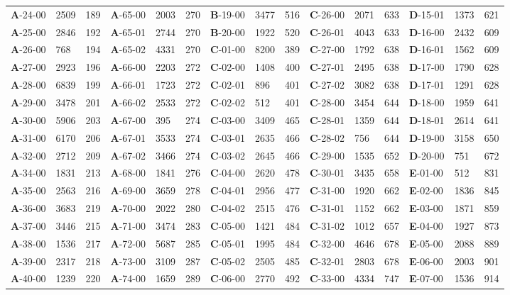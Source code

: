 \begin{table*}
\begin{tabular}{lllllllllllllll}
\textbf{A}-24-00&2509&189&\textbf{A}-65-00&2003&270&\textbf{B}-19-00&3477&516&\textbf{C}-26-00&2071&633&\textbf{D}-15-01&1373&621\\
\textbf{A}-25-00&2846&192&\textbf{A}-65-01&2744&270&\textbf{B}-20-00&1922&520&\textbf{C}-26-01&4043&633&\textbf{D}-16-00&2432&609\\
\textbf{A}-26-00&768&194&\textbf{A}-65-02&4331&270&\textbf{C}-01-00&8200&389&\textbf{C}-27-00&1792&638&\textbf{D}-16-01&1562&609\\
\textbf{A}-27-00&2923&196&\textbf{A}-66-00&2203&272&\textbf{C}-02-00&1408&400&\textbf{C}-27-01&2495&638&\textbf{D}-17-00&1790&628\\
\textbf{A}-28-00&6839&199&\textbf{A}-66-01&1723&272&\textbf{C}-02-01&896&401&\textbf{C}-27-02&3082&638&\textbf{D}-17-01&1291&628\\
\textbf{A}-29-00&3478&201&\textbf{A}-66-02&2533&272&\textbf{C}-02-02&512&401&\textbf{C}-28-00&3454&644&\textbf{D}-18-00&1959&641\\
\textbf{A}-30-00&5906&203&\textbf{A}-67-00&395&274&\textbf{C}-03-00&3409&465&\textbf{C}-28-01&1359&644&\textbf{D}-18-01&2614&641\\
\textbf{A}-31-00&6170&206&\textbf{A}-67-01&3533&274&\textbf{C}-03-01&2635&466&\textbf{C}-28-02&756&644&\textbf{D}-19-00&3158&650\\
\textbf{A}-32-00&2712&209&\textbf{A}-67-02&3466&274&\textbf{C}-03-02&2645&466&\textbf{C}-29-00&1535&652&\textbf{D}-20-00&751&672\\
\textbf{A}-34-00&1831&213&\textbf{A}-68-00&1841&276&\textbf{C}-04-00&2620&478&\textbf{C}-30-01&3435&658&\textbf{E}-01-00&512&831\\
\textbf{A}-35-00&2563&216&\textbf{A}-69-00&3659&278&\textbf{C}-04-01&2956&477&\textbf{C}-31-00&1920&662&\textbf{E}-02-00&1836&845\\
\textbf{A}-36-00&3683&219&\textbf{A}-70-00&2022&280&\textbf{C}-04-02&2515&476&\textbf{C}-31-01&1152&662&\textbf{E}-03-00&1871&859\\
\textbf{A}-37-00&3446&215&\textbf{A}-71-00&3474&283&\textbf{C}-05-00&1421&484&\textbf{C}-31-02&1012&657&\textbf{E}-04-00&1927&873\\
\textbf{A}-38-00&1536&217&\textbf{A}-72-00&5687&285&\textbf{C}-05-01&1995&484&\textbf{C}-32-00&4646&678&\textbf{E}-05-00&2088&889\\
\textbf{A}-39-00&2317&218&\textbf{A}-73-00&3109&287&\textbf{C}-05-02&2505&485&\textbf{C}-32-01&2803&678&\textbf{E}-06-00&2003&901\\
\textbf{A}-40-00&1239&220&\textbf{A}-74-00&1659&289&\textbf{C}-06-00&2770&492&\textbf{C}-33-00&4334&747&\textbf{E}-07-00&1536&914\\

\end{tabular}
\end{table*}
